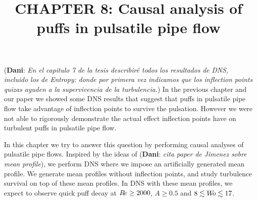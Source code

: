 \documentclass{article}
\title{CHAPTER 8: Causal analysis of puffs in pulsatile pipe flow}
\date{}
\DeclareRobustCommand{\dm}[1]{{\color{blue}(\textbf{Dani}: \textit{#1}\xspace)}}
\DeclareRobustCommand{\Reynolds}{\ensuremath{R\hspace{-0.1em}e}\xspace}     %
\DeclareRobustCommand{\Womersley}{\ensuremath{W\hspace{-0.25em}o}\xspace}    %
\DeclareRobustCommand{\Amplitude}{\ensuremath{A}\xspace}    %
\begin{document}
\maketitle
\dm{En el capitulo 7 de la tesis describiré todos los resultados de DNS, incluido los de Entropy: donde por primera vez indicamos que los inflection points quizas ayuden a la supervivencia de la turbulencia.} In the previous chapter and our paper \citep{entropy2021} we showed some DNS results that suggest that puffs in pulsatile pipe flow take advantage of inflection points to survive the pulsation. However we were not able to rigorously demonstrate the actual effect inflection points have on turbulent puffs in pulsatile pipe flow. 

In this chapter we try to answer this question by performing causal analyses of pulsatile pipe flows. Inspired by the ideas of \dm{cita paper de Jimenez sobre mean profile}, we perform DNS where we impose an artificially generated mean profile. We generate mean profiles without inflection points, and study turbulence survival on top of these mean profiles. In DNS with these mean profiles, we expect to observe quick puff decay at $\Reynolds \geq 2000$, $\Amplitude \geq 0.5$ and $8 \lesssim \Womersley \lesssim 17$. 

















\end{document}
